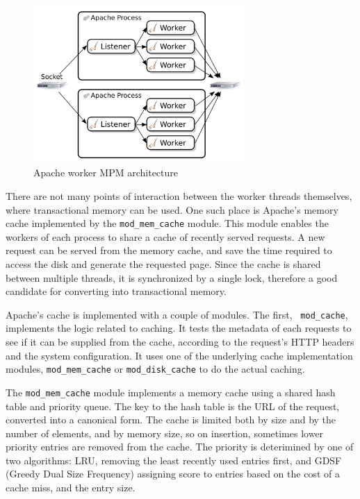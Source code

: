 \documentclass[preprint,natbib,11pt]{sigplanconf}
\begin{document}
\begin{figure}
 \begin{center}
  \includegraphics[width=8cm]{Apache-Worker-MPM.png}
 \end{center}
 \caption{Apache worker MPM architecture}
 \label{apache-worker-MPM}
\end{figure}

There are not many points of interaction between the worker threads themselves,
where transactional memory can be used. One such place is Apache's memory cache
implemented by the {\tt mod\_mem\_cache}\cite{apache:mod_mem_cache} module. This
module enables the workers of each process to share a cache of recently served
requests. A new request can be served from the memory cache, and save the time
required to access the disk and generate the requested page. Since the cache is
shared between multiple threads, it is synchronized by a single lock, therefore
a good candidate for converting into transactional memory.

Apache's cache is implemented with a couple of modules. The first, {\tt
mod\_cache}\cite{apache:mod_cache}, implements the logic related to caching. It
tests the metadata of each requests to see if it can be supplied from the cache,
according to the request's HTTP headers and the system configuration. It uses
one of the underlying cache implementation modules, {\tt mod\_mem\_cache} or
{\tt mod\_disk\_cache}\cite{apache:mod_disk_cache} to do the actual caching.

The {\tt mod\_mem\_cache} module implements a memory cache using a shared hash
table and priority queue. The key to the hash table is the URL of the request,
converted into a canonical form. The cache is limited both by size and by the
number of elements, and by memory size, so on insertion, sometimes lower
priority entries are removed from the cache. The priority is deterimined by one
of two algorithms: LRU, removing the least recently used entries first, and GDSF
(Greedy Dual Size Frequency) assigning score to entries based on the cost of a
cache miss, and the entry size.
\end{document}

